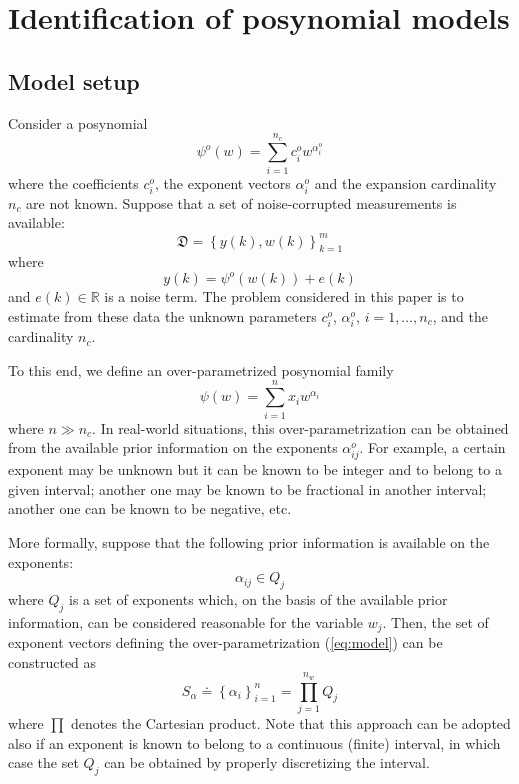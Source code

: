 \documentclass[11pt]{article}
\begin{document}
\section{Identification of posynomial models}
\label{sec:id_pos}

\subsection{Model setup}
\label{pp_id}
Consider a posynomial
\begin{equation}
\psi^{o}(w)=\sum_{i=1}^{n_{c}}c_{i}^{o}w^{\alpha_{i}^{o}}\label{eq:fo}
\end{equation}
where the coefficients $c_{i}^{o}$, the exponent vectors $\alpha_{i}^{o}$
and the expansion cardinality $n_{c}$ are not known. Suppose that
a set of noise-corrupted measurements is available:
\[
\mathfrak{D}=\left\{ y(k),w(k)\right\} _{k=1}^{m}
\]
where 
\[
y(k)=\psi^{o}(w(k))+e(k)
\]
and $e(k)\in\mathbb{R}$ is a noise term. The problem considered in this
paper is to estimate from these data the unknown parameters $c_{i}^{o}$,
$\alpha_{i}^{o}$, $i=1,\ldots,n_{c}$, and the cardinality $n_{c}$.

To this end, we define an over-parametrized posynomial family
\begin{equation}
\psi(w)=\sum_{i=1}^{n}x_{i}w^{\alpha_{i}}\label{eq:model}
\end{equation}
where $n\gg n_{c}$. In real-world situations, this over-parametrization
can be obtained from the available prior information on the exponents
$\alpha_{ij}^{o}$. For example, a certain exponent may be unknown
but it can be known to be  integer and to belong to a given interval; another
one may be known to be fractional in another interval; another one can be known to be negative,
etc.

More formally, suppose that the following prior information is available
on the exponents:
\begin{equation}
\alpha_{ij}\in Q_{j}\label{eq:prior1}
\end{equation}
where $Q_{j}$ is a set of exponents which, on the basis of the available
prior information, can be considered reasonable for the variable $w_{j}$.
Then, the set of exponent vectors defining the over-parametrization
(\ref{eq:model}) can be constructed as
\[
S_{\alpha}\doteq\left\{ \alpha_{i}\right\} _{i=1}^{n}=\prod_{j=1}^{n_{w}}Q_{j}
\]
where $\prod$ denotes the Cartesian product. Note that this approach
can be adopted also if an exponent is known to belong to a continuous
(finite) interval, in which case the set $Q_{j}$ can be obtained by properly discretizing
the interval.
\end{document}
